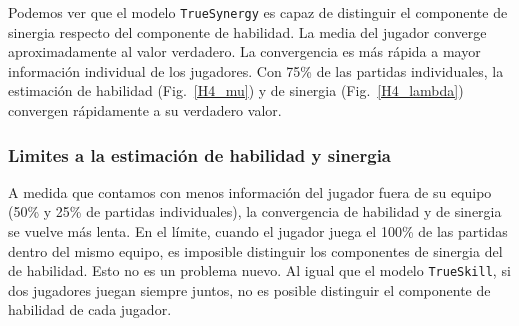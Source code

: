 \documentclass[a4paper,11pt]{book}
\theoremstyle{definition}
\begin{document}
Podemos ver que el modelo \texttt{TrueSynergy} es capaz de distinguir el componente de sinergia respecto del componente de habilidad.
La media del jugador converge aproximadamente al valor verdadero.
La convergencia es m\'as r\'apida a mayor informaci\'on individual de los jugadores.
Con 75\% de las partidas individuales, la estimaci\'on de habilidad (Fig.~\ref{H4_mu}) y de sinergia (Fig.~\ref{H4_lambda}) convergen r\'apidamente a su verdadero valor.

\subsubsection{Limites a la estimaci\'on de habilidad y sinergia}

A medida que contamos con menos informaci\'on del jugador fuera de su equipo (50\% y 25\% de partidas individuales), la convergencia de habilidad y de sinergia se vuelve m\'as lenta.
En el l\'imite, cuando el jugador juega el 100\% de las partidas dentro del mismo equipo, es imposible distinguir los componentes de sinergia del de habilidad.
Esto no es un problema nuevo.
Al igual que el modelo \texttt{TrueSkill}, si dos jugadores juegan siempre juntos, no es posible distinguir el componente de habilidad de cada jugador.
\end{document}
